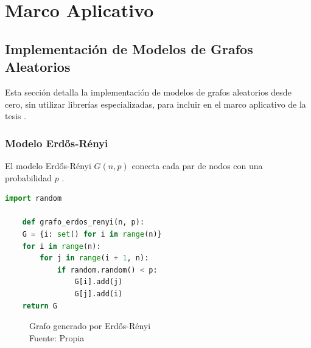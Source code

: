 \chapter{Marco Aplicativo}

\section{Implementación de Modelos de Grafos Aleatorios}
Esta sección detalla la implementación de modelos de grafos aleatorios desde cero, sin utilizar librerías especializadas, para incluir en el marco aplicativo de la tesis .


\subsection{Modelo Erdős-Rényi}
El modelo Erdős-Rényi \( G(n, p) \) conecta cada par de nodos con una probabilidad \( p \) .

\begin{lstlisting}[language=Python]
    import random
    
    def grafo_erdos_renyi(n, p):
    G = {i: set() for i in range(n)}
    for i in range(n):
        for j in range(i + 1, n):
            if random.random() < p:
                G[i].add(j)
                G[j].add(i)
    return G
\end{lstlisting}
\newpage

\begin{figure}
\caption{Grafo generado por Erdős-Rényi\\Fuente: Propia}
\end{figure}

